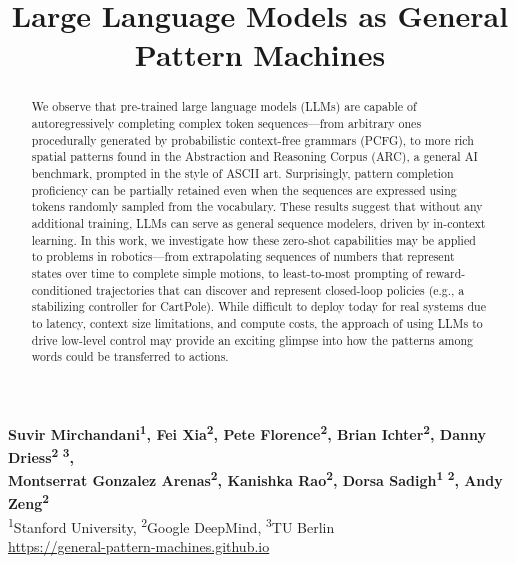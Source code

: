 \documentclass{article}
\title{Large Language Models as General Pattern Machines}
\newcommand{\eg}{e.g., }
\begin{document}
\maketitle
\vspace{-4.5em}
\begin{center}
    \textbf{
        Suvir Mirchandani\textsuperscript{1},
        Fei Xia\textsuperscript{2},
        Pete Florence\textsuperscript{2},
        Brian Ichter\textsuperscript{2},
        Danny Driess\textsuperscript{2 3}, \\
        Montserrat Gonzalez Arenas\textsuperscript{2},
        Kanishka Rao\textsuperscript{2},
        Dorsa Sadigh\textsuperscript{1 2},
        Andy Zeng\textsuperscript{2}
    }\\
    \textsuperscript{1}Stanford University,
    \textsuperscript{2}Google DeepMind,
    \textsuperscript{3}TU Berlin \\
    \url{https://general-pattern-machines.github.io}
\end{center}
\vspace{1em}
\begin{abstract}
We observe that pre-trained large language models (LLMs) are capable of autoregressively completing complex token sequences---from arbitrary ones procedurally generated by probabilistic context-free grammars (PCFG), to more rich spatial patterns found in the Abstraction and Reasoning Corpus (ARC), a general AI benchmark, prompted in the style of ASCII art. Surprisingly, pattern completion proficiency can be partially retained even when the sequences are expressed using tokens randomly sampled from the vocabulary. These results suggest that without any additional training, LLMs can serve as general sequence modelers, driven by in-context learning. In this work, we investigate how these zero-shot capabilities may be applied to problems in robotics---from extrapolating sequences of numbers that represent states over time to complete simple motions, to least-to-most prompting of reward-conditioned trajectories that can discover and represent closed-loop policies (\eg a stabilizing controller for CartPole). While difficult to deploy today for real systems due to latency, context size limitations, and compute costs, the approach of using LLMs to drive low-level control may provide an exciting glimpse into how the patterns among words could be transferred to actions.
\end{abstract}
\end{document}
